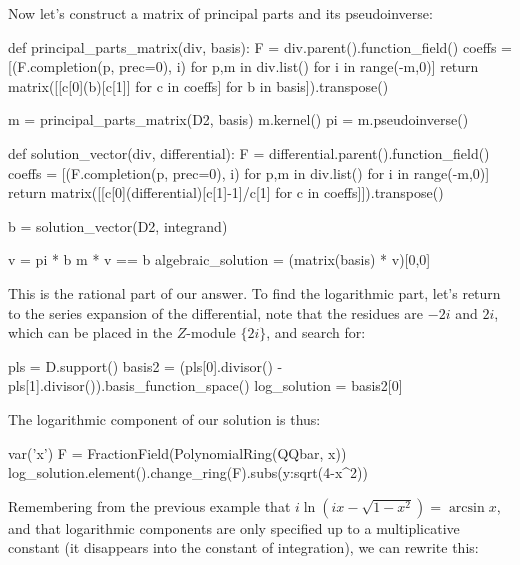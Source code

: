 Now let's construct a matrix of principal parts
and its pseudoinverse:

\begin{sageblock}[ex8.7]
def principal_parts_matrix(div, basis):
    F = div.parent().function_field()
    coeffs = [(F.completion(p, prec=0), i) for p,m in div.list() for i in range(-m,0)]
    return matrix([[c[0](b)[c[1]] for c in coeffs] for b in basis]).transpose()
\end{sageblock}

\begin{sageblock}[ex8.7]
m = principal_parts_matrix(D2, basis)
m.kernel()
pi = m.pseudoinverse()
\end{sageblock}

\begin{sageblock}[ex8.7]
def solution_vector(div, differential):
    F = differential.parent().function_field()
    coeffs = [(F.completion(p, prec=0), i) for p,m in div.list() for i in range(-m,0)]
    return matrix([[c[0](differential)[c[1]-1]/c[1] for c in coeffs]]).transpose()
\end{sageblock}

\begin{sageblock}[ex8.7]
b = solution_vector(D2, integrand)
\end{sageblock}

\begin{sageblock}[ex8.7]
v = pi * b
m * v == b
algebraic_solution = (matrix(basis) * v)[0,0]
\end{sageblock}

This is the rational part of our answer.  To find the logarithmic
part, let's return to the series expansion of the differential,
note that the residues are $-2i$ and $2i$, which can be placed
in the $Z$-module $\{2i\}$, and search for:

\begin{sageblock}[ex8.7]
pls = D.support()
basis2 = (pls[0].divisor() - pls[1].divisor()).basis_function_space()
log_solution = basis2[0]
\end{sageblock}

The logarithmic component of our solution is thus:

\begin{sageblock}[ex8.7]
var('x')
F = FractionField(PolynomialRing(QQbar, x))
log_solution.element().change_ring(F).subs({y:sqrt(4-x^2)})
\end{sageblock}

Remembering from the previous example that $i \ln(ix-\sqrt{1-x^2}) = \arcsin x$,
and that logarithmic components are only specified up
to a multiplicative constant (it disappears into the constant
of integration), we can rewrite this:


